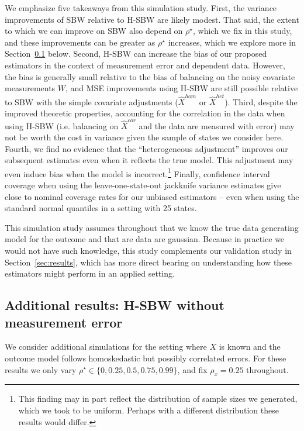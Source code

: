 We emphasize five takeaways from this simulation study. First, the variance improvements of SBW relative to H-SBW are likely modest. That said, the extent to which we can improve on SBW also depend on $\rho^\star$, which we fix in this study, and these improvements can be greater as $\rho^\star$ increases, which we explore more in Section~\ref{appssec:simstudyresults2} below. Second, H-SBW can increase the bias of our proposed estimators in the context of measurement error and dependent data. However, the bias is generally small relative to the bias of balancing on the noisy covariate measurements $W$, and MSE improvements using H-SBW are still possible relative to SBW with the simple covariate adjustments ($\hat{X}^{hom}$ or $\hat{X}^{het}$). Third, despite the improved theoretic properties, accounting for the correlation in the data when using H-SBW (i.e. balancing on $\hat{X}^{cor}$ and the data are measured with error) may not be worth the cost in variance given the sample of states we consider here. Fourth, we find no evidence that the ``heterogeneous adjustment'' improves our subsequent estimates even when it reflects the true model. This adjustment may even induce bias when the model is incorrect.\footnote{This finding may in part reflect the distribution of sample sizes we generated, which we took to be uniform. Perhaps with a different distribution these results would differ.} Finally, confidence interval coverage when using the leave-one-state-out jackknife variance estimates give close to nominal coverage rates for our unbiased estimators -- even when using the standard normal quantiles in a setting with 25 states. 

This simulation study assumes throughout that we know the true data generating model for the outcome and that are data are gaussian. Because in practice we would not have such knowledge, this study complements our validation study in Section~\ref{sec:results}, which has more direct bearing on understanding how these estimators might perform in an applied setting.

\subsection{Additional results: H-SBW without measurement error}\label{appssec:simstudyresults2}

We consider additional simulations for the setting where $X$ is known and the outcome model follows homoskedastic but possibly correlated errors. For these results we only vary $\rho^\star \in \{0, 0.25, 0.5, 0.75, 0.99\}$, and fix $\rho_x = 0.25$ throughout. 

